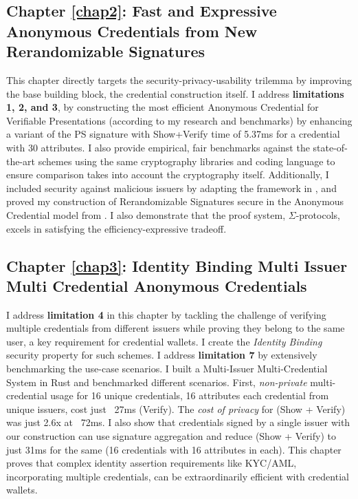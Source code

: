 \subsection{Chapter \ref{chap2}: Fast and Expressive Anonymous Credentials from New Rerandomizable Signatures}
This chapter directly targets the security-privacy-usability trilemma by improving the base building block, the credential construction itself. I address \textbf{limitations 1, 2, and 3}, by constructing the most efficient Anonymous Credential for Verifiable Presentations (according to my research and benchmarks) by enhancing a variant \cite{tomescu_utt_2022} of the PS signature \cite{sako_short_2016} with Show+Verify time of 5.37ms for a credential with 30 attributes. I also provide empirical, fair benchmarks against the state-of-the-art schemes \cite{hutchison_constant-size_2006, camenisch_anonymous_2016, sako_short_2016, tomescu_utt_2022} using the same cryptography libraries and coding language to ensure comparison takes into account the cryptography itself. Additionally, I included security against malicious issuers by adapting the framework in \cite{fuchsbauer_structure-preserving_2019}, and proved my construction of Rerandomizable Signatures secure in the Anonymous Credential model from \cite{fuchsbauer_structure-preserving_2019}. I also demonstrate that the proof system, $\Sigma$-protocols, excels in satisfying the efficiency-expressive tradeoff. 


\subsection{Chapter \ref{chap3}: Identity Binding Multi Issuer Multi Credential Anonymous Credentials}
I address \textbf{limitation 4} in this chapter by tackling the challenge of verifying multiple credentials from different issuers while proving they belong to the same user, a key requirement for credential wallets. I create the \emph{Identity Binding} security property for such schemes. I address \textbf{limitation 7} by extensively benchmarking the use-case scenarios. I built a Multi-Issuer Multi-Credential System in Rust and benchmarked different scenarios. First, \emph{non-private} multi-credential usage for 16 unique credentials, 16 attributes each credential from unique issuers, cost just ~27ms (Verify). The \emph{cost of privacy} for (Show + Verify) was just 2.6x at ~72ms. I also show that credentials signed by a single issuer with our construction can use signature aggregation and reduce (Show + Verify) to just 31ms for the same (16 credentials with 16 attributes in each). This chapter proves that complex identity assertion requirements like KYC/AML, incorporating multiple credentials, can be extraordinarily efficient with credential wallets.



